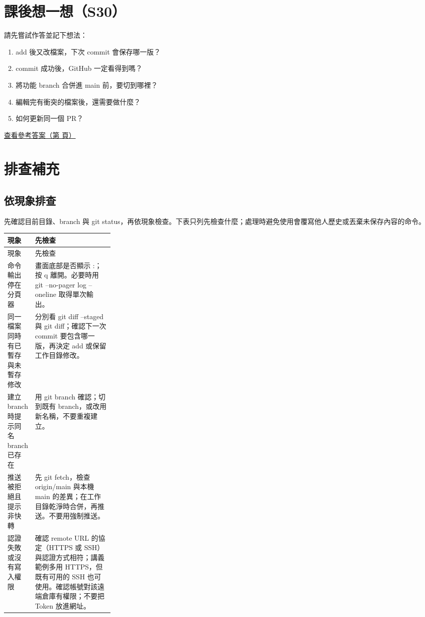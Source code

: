 \documentclass[11pt,a4paper]{article}
\DeclareRobustCommand{\code}[1]{{\small\ttfamily #1}}
\newcommand{\AnswerLink}[1]{%
    \par\noindent\hyperref[#1]{\textcolor{handoutaccent}{查看參考答案（第 \pageref*{#1} 頁）}}\par}
\begin{document}
\section{課後想一想（S30）}
\label{exercise:review}

請先嘗試作答並記下想法：

\begin{enumerate}
    \item \code{add} 後又改檔案，下次 \code{commit} 會保存哪一版？
    \item \code{commit} 成功後，GitHub 一定看得到嗎？
    \item 將功能 branch 合併進 \code{main} 前，要切到哪裡？
    \item 編輯完有衝突的檔案後，還需要做什麼？
    \item 如何更新同一個 PR？
\end{enumerate}

\AnswerLink{answer:review}

\section{排查補充}

\subsection{依現象排查}

先確認目前目錄、branch 與 \code{git status}，再依現象檢查。下表只列先檢查什麼；處理時避免使用會覆寫他人歷史或丟棄未保存內容的命令。

\begin{longtable}{@{}p{0.25\linewidth}p{}@{}}
\toprule
現象 & 先檢查 \\
\midrule
\endfirsthead
\toprule
現象 & 先檢查 \\
\midrule
\endhead
\bottomrule
\endfoot
命令輸出停在分頁器 & 畫面底部是否顯示 \code{:}；按 \code{q} 離開。必要時用 \code{git --no-pager log --oneline} 取得單次輸出。 \\
\addlinespace
同一檔案同時有已暫存與未暫存修改 & 分別看 \code{git diff --staged} 與 \code{git diff}；確認下一次 commit 要包含哪一版，再決定 \code{add} 或保留工作目錄修改。 \\
\addlinespace
建立 branch 時提示同名 branch 已存在 & 用 \code{git branch} 確認；切到既有 branch，或改用新名稱，不要重複建立。 \\
\addlinespace
推送被拒絕且提示非快轉 & 先 \code{git fetch}，檢查 \code{origin/main} 與本機 \code{main} 的差異；在工作目錄乾淨時合併，再推送。不要用強制推送。 \\
\addlinespace
認證失敗或沒有寫入權限 & 確認 remote URL 的協定（HTTPS 或 SSH）與認證方式相符；講義範例多用 HTTPS，但既有可用的 SSH 也可使用。確認帳號對該遠端倉庫有權限；不要把 Token 放進網址。 \\
\end{longtable}
\end{document}
